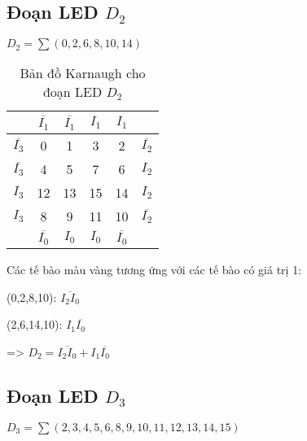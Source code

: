 \subsection{Đoạn LED \texorpdfstring{$D_2$}{D2}}

\(D_2 = \sum(0,2,6,8,10,14)\)

\begin{table}[H]
	\centering
	\begin{tabular}{|c|c|c|c|c|c|}
		\hline
		                   & \(\overline{I_1}\)  & \(\overline{I_1}\) & \(I_1\) & \(I_1\)              &                    \\
		\hline
		\(\overline{I_3}\) & \cellcolor{yellow}0 & 1                  & 3       & \cellcolor{yellow}2  & \(\overline{I_2}\) \\
		\hline
		\(\overline{I_3}\) & 4                   & 5                  & 7       & \cellcolor{yellow}6  & \(I_2\)            \\
		\hline
		\(I_3\)            & 12                  & 13                 & 15      & \cellcolor{yellow}14 & \(I_2\)            \\
		\hline
		\(I_3\)            & \cellcolor{yellow}8 & 9                  & 11      & \cellcolor{yellow}10 & \(\overline{I_2}\) \\
		\hline
		                   & \(\overline{I_0}\)  & \(I_0\)            & \(I_0\) & \(\overline{I_0}\)   &                    \\
		\hline
	\end{tabular}
	\caption*{Bản đồ Karnaugh cho đoạn LED \(D_2\)}
\end{table}

Các tế bào màu vàng tương ứng với các tế bào có giá trị 1:

(0,2,8,10): \(\overline{I_2 I_0}\)

(2,6,14,10): \(I_1 \overline{I_0}\)

=> \(D_2 = \overline{I_2 I_0} + I_1 \overline{I_0}\)

\subsection{Đoạn LED \texorpdfstring{$D_3$}{D3}}

\(D_3 = \sum(2,3,4,5,6,8,9,10,11,12,13,14,15)\)

